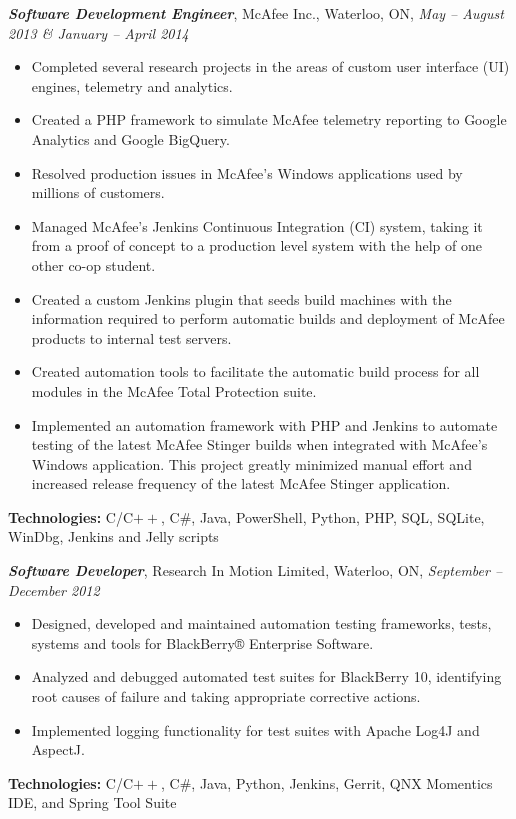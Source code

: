 \documentclass[10pt,letterpaper]{article}
\newcommand{\job}[4]
{
    \emph{\textbf{#1}}, #2, #3, \emph{#4}
}
\begin{document}
\vspace{0.8em}
\job{Software Development Engineer}{McAfee Inc.}{Waterloo, ON}{ May -- August 2013 \& January -- April 2014 }\\
\begin{adjustwidth}{0.1in}{0.5in}
    \begin{itemize}
	\item Completed several research projects in the areas of custom user interface (UI) engines, telemetry and analytics.
    \item Created a PHP framework to simulate McAfee telemetry reporting to Google Analytics and Google BigQuery.
	\item Resolved production issues in McAfee's Windows applications used by millions of customers.
	\item Managed McAfee's Jenkins Continuous Integration (CI) system, taking it from a proof of concept to a production level system with the help 
	    of one other co-op student.
	\item Created a custom Jenkins plugin that seeds build machines with the information required to perform automatic builds and 
	    deployment of McAfee products to internal test servers.
	\item Created automation tools to facilitate the automatic build process for all modules in the 
	    McAfee Total Protection suite.
	\item Implemented an automation framework with PHP and Jenkins to automate testing of the latest McAfee Stinger builds when integrated  
	    with McAfee's Windows application. This project greatly minimized manual effort and increased release frequency of the latest McAfee Stinger application.  
    \end{itemize}
    \vspace{0.5em}
    \textbf{Technologies:} C/C$++$, C\#, Java, PowerShell, Python, PHP, SQL, SQLite, WinDbg, Jenkins and Jelly scripts
\end{adjustwidth}
\vspace{0.8em}
\job{Software Developer}{Research In Motion Limited}{Waterloo, ON}{September -- December 2012}\\
\begin{adjustwidth}{0.1in}{0.5in}
    \begin{itemize}
	\item Designed, developed and maintained automation testing frameworks, tests, systems and tools for 
	    BlackBerry® Enterprise Software.
	\item Analyzed and debugged automated test suites for BlackBerry 10, identifying root causes of failure and 
	    taking appropriate corrective actions.
	\item Implemented logging functionality for test suites with Apache Log4J and AspectJ.
    \end{itemize}
    \vspace{0.5em}
    \textbf{Technologies:} C/C$++$, C\#, Java, Python, Jenkins, Gerrit, QNX Momentics IDE, and Spring Tool Suite
\end{adjustwidth}
\end{document}
